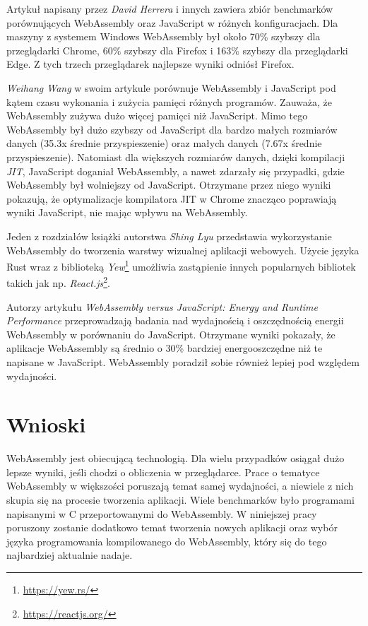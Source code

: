 \documentclass[language=polish,type=master]{aghmodern}
\begin{document}
Artykuł \cite{wasm_js_bench} napisany przez \emph{David Herrera} i innych zawiera zbiór benchmarków porównujących WebAssembly oraz JavaScript w różnych konfiguracjach.
Dla maszyny z systemem Windows WebAssembly był około 70\% szybszy dla przeglądarki Chrome, 60\% szybszy dla Firefox i 163\% szybszy dla przeglądarki Edge.
Z tych trzech przeglądarek najlepsze wyniki odniósł Firefox.

\emph{Weihang Wang} w swoim artykule \cite{wasm_js_bench2} porównuje WebAssembly i JavaScript pod kątem czasu wykonania i zużycia pamięci różnych programów.
Zauważa, że WebAssembly zużywa dużo więcej pamięci niż JavaScript.
Mimo tego WebAssembly był dużo szybszy od JavaScript dla bardzo małych rozmiarów danych (35.3x średnie przyspieszenie) oraz małych danych (7.67x średnie przyspieszenie).
Natomiast dla większych rozmiarów danych, dzięki kompilacji \emph{JIT}\footnotemark{}, JavaScript doganiał WebAssembly, a nawet zdarzały się przypadki, gdzie WebAssembly był wolniejszy od JavaScript.
Otrzymane przez niego wyniki pokazują, że optymalizacje kompilatora JIT w Chrome znacząco poprawiają wyniki JavaScript, nie mając wpływu na WebAssembly.

Jeden z rozdziałów książki \cite{wasm_yew} autorstwa \emph{Shing Lyu} przedstawia wykorzystanie WebAssembly do tworzenia warstwy wizualnej aplikacji webowych.
Użycie języka Rust wraz z biblioteką \emph{Yew}\footnote{\url{https://yew.rs/}} umożliwia zastąpienie innych popularnych bibliotek takich jak np. \emph{React.js}\footnote{\url{https://reactjs.org/}}.

Autorzy artykułu \cite{wasm_energy} \emph{WebAssembly versus JavaScript: Energy and Runtime Performance} przeprowadzają badania nad wydajnością i oszczędnością energii WebAssembly w porównaniu do JavaScript.
Otrzymane wyniki pokazały, że aplikacje WebAssembly są średnio o 30\% bardziej energooszczędne niż te napisane w JavaScript.
WebAssembly poradził sobie również lepiej pod względem wydajności.

\section{Wnioski}
WebAssembly jest obiecującą technologią.
Dla wielu przypadków osiągał dużo lepsze wyniki, jeśli chodzi o obliczenia w przeglądarce.
Prace o tematyce WebAssembly w większości poruszają temat samej wydajności, a niewiele z nich skupia się na procesie tworzenia aplikacji.
Wiele benchmarków było programami napisanymi w C przeportowanymi\footnotemark{} do WebAssembly.
W niniejszej pracy poruszony zostanie dodatkowo temat tworzenia nowych aplikacji oraz wybór języka programowania kompilowanego do WebAssembly, który się do tego najbardziej aktualnie nadaje.
\end{document}
